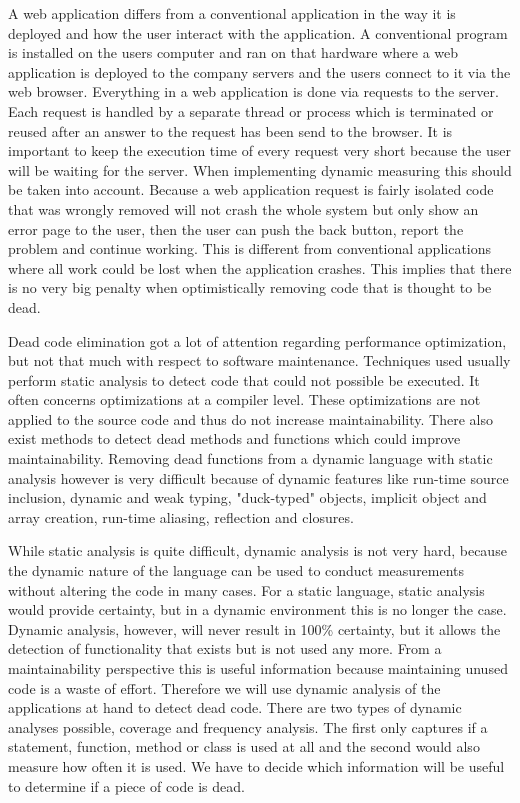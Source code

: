 A web application differs from a conventional application in the way it is deployed and how the user interact with the application. A conventional program is installed on the users computer and ran on that hardware where a web application is deployed to the company servers and the users connect to it via the web browser. Everything in a web application is done via requests to the server. Each request is handled by a separate thread or process which is terminated or reused after an answer to the request has been send to the browser. It is important to keep the execution time of every request very short because the user will be waiting for the server. When implementing dynamic measuring this should be taken into account. Because a web application request is fairly isolated code that was wrongly removed will not crash the whole system but only show an error page to the user, then the user can push the back button, report the problem and continue working. This is different from conventional applications where all work could be lost when the application crashes. This implies that there is no very big penalty when optimistically removing code that is thought to be dead.

Dead code elimination got a lot of attention regarding performance optimization, but not that much with respect to software maintenance. Techniques used usually perform static analysis to detect code that could not possible be executed. It often concerns optimizations at a compiler level. These optimizations are not applied to the source code and thus do not increase maintainability. There also exist methods to detect dead methods and functions\cite{bacon1996,srivastava1992} which could improve maintainability. Removing dead functions from a dynamic language with static analysis however is very difficult because of dynamic features like run-time source inclusion, dynamic and weak typing, "duck-typed" objects, implicit object and array creation, run-time aliasing, reflection and closures\cite{biggar2009,biggar2009draft,biggar2010,devries2007,tratt2009}.

While static analysis is quite difficult, dynamic analysis is not very hard, because the dynamic nature of the language can be used to conduct measurements without altering the code in many cases. For a static language, static analysis would provide certainty, but in a dynamic environment this is no longer the case. Dynamic analysis, however, will never result in 100\% certainty, but it allows the detection of functionality that exists but is not used any more. From a maintainability perspective this is useful information because maintaining unused code is a waste of effort. Therefore we will use dynamic analysis of the applications at hand to detect dead code. There are two types of dynamic analyses possible, coverage and frequency analysis\cite{ball1999}. The first only captures if a statement, function, method or class is used at all and the second would also measure how often it is used. We have to decide which information will be useful to determine if a piece of code is dead.

